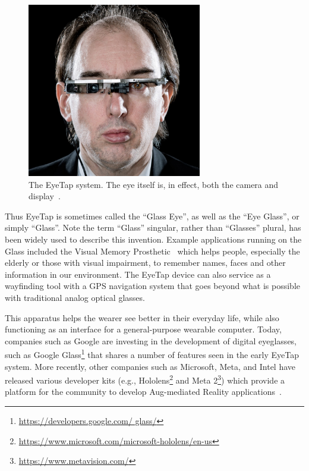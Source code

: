 \begin{figure}
  \center
  \includegraphics[width=3.0in]{ch1/figures/eyetap.jpg}
  \caption{The EyeTap system. The eye itself is, in effect, both the camera and display~\cite{mann2013steve}.}
  \label{fig:eyetap_mann_black}
\end{figure}

Thus EyeTap is sometimes called the ``Glass Eye'', as well as the ``Eye Glass'', or simply ``Glass''. 
Note the term ``Glass'' singular, rather than ``Glasses'' plural, has been widely used to describe this 
invention. Example applications running on the Glass included the Visual Memory 
Prosthetic~\cite{mannaaai361} which helps people, especially the elderly or those with visual 
impairment, to remember names, faces and other information in our environment. The EyeTap device 
can also service as a wayfinding tool with a GPS navigation system that goes beyond what is possible 
with traditional analog optical glasses. 

This apparatus helps the wearer see better in their everyday life, while also functioning as an interface 
for a general-purpose wearable computer. Today, companies such as Google are investing in the 
development of digital eyeglasses, such as Google Glass\footnote{\url{https://developers.google.com/
glass/}} that shares a number of features seen in the early EyeTap system. More recently, other 
companies such as Microsoft, Meta, and Intel have released various developer kits (e.g., 
Hololens\footnote{\url{https://www.microsoft.com/microsoft-hololens/en-us}} and Meta 
2\footnote{\url{https://www.metavision.com/}}) which provide a platform for the community to develop 
Aug-mediated Reality applications~\cite{mann1994mediated}.


